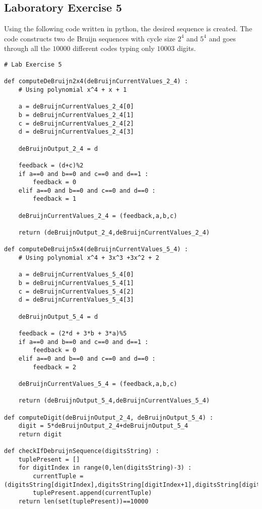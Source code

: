 \documentclass{article}
\begin{document}
\subsection{Laboratory Exercise 5}

Using the following code written in python, the desired sequence is created. The code constructs two de Bruijn sequences with cycle size $2^4$ and $5^4$ and goes through all the $10000$ different codes typing only $10003$ digits.

\begin{verbatim}
# Lab Exercise 5

def computeDeBruijn2x4(deBruijnCurrentValues_2_4) :
    # Using polynomial x^4 + x + 1

    a = deBruijnCurrentValues_2_4[0]
    b = deBruijnCurrentValues_2_4[1]
    c = deBruijnCurrentValues_2_4[2]
    d = deBruijnCurrentValues_2_4[3]

    deBruijnOutput_2_4 = d

    feedback = (d+c)%2
    if a==0 and b==0 and c==0 and d==1 :
        feedback = 0
    elif a==0 and b==0 and c==0 and d==0 :
        feedback = 1

    deBruijnCurrentValues_2_4 = (feedback,a,b,c)

    return (deBruijnOutput_2_4,deBruijnCurrentValues_2_4)

def computeDeBruijn5x4(deBruijnCurrentValues_5_4) :
    # Using polynomial x^4 + 3x^3 +3x^2 + 2

    a = deBruijnCurrentValues_5_4[0]
    b = deBruijnCurrentValues_5_4[1]
    c = deBruijnCurrentValues_5_4[2]
    d = deBruijnCurrentValues_5_4[3]

    deBruijnOutput_5_4 = d

    feedback = (2*d + 3*b + 3*a)%5
    if a==0 and b==0 and c==0 and d==1 :
        feedback = 0
    elif a==0 and b==0 and c==0 and d==0 :
        feedback = 2

    deBruijnCurrentValues_5_4 = (feedback,a,b,c)

    return (deBruijnOutput_5_4,deBruijnCurrentValues_5_4)

def computeDigit(deBruijnOutput_2_4, deBruijnOutput_5_4) :
    digit = 5*deBruijnOutput_2_4+deBruijnOutput_5_4
    return digit

def checkIfDebruijnSequence(digitsString) :
    tuplePresent = []
    for digitIndex in range(0,len(digitsString)-3) :
        currentTuple = (digitsString[digitIndex],digitsString[digitIndex+1],digitsString[digitIndex+2],digitsString[digitIndex+3])
        tuplePresent.append(currentTuple)
    return len(set(tuplePresent))==10000



\end{verbatim}
\end{document}
